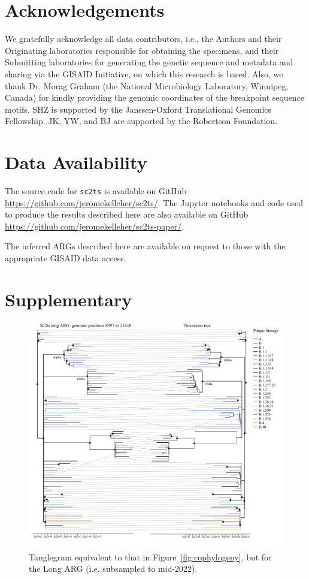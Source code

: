 \documentclass{article}
\begin{document}
\section{Acknowledgements}
We gratefully acknowledge all data contributors, i.e., the Authors and their
Originating laboratories responsible for obtaining the specimens, and their
Submitting laboratories for generating the genetic sequence and metadata and
sharing via the GISAID Initiative, on which this research is based. Also, we
thank Dr. Morag Graham (the National Microbiology Laboratory, Winnipeg, Canada)
for kindly providing the genomic coordinates of the breakpoint sequence motifs.
SHZ is supported by the Janssen-Oxford Translational Genomics Fellowship. JK,
YW, and BJ are supported by the Robertson Foundation.

\section{Data Availability}
The source code for \texttt{sc2ts} is
available on GitHub
\url{https://github.com/jeromekelleher/sc2ts/}.
The Jupyter notebooks and code used to produce the results described here are also
available on GitHub \url{https://github.com/jeromekelleher/sc2ts-paper/}.

The inferred ARGs described here are available on request to those with
the appropriate GISAID data access.




\renewcommand\thefigure{S\arabic{figure}}
\setcounter{figure}{0}
\renewcommand\thetable{S\arabic{table}}
\setcounter{table}{0}
\section*{Supplementary}
\begin{figure} \centering
\includegraphics[width=\textwidth]{figures/supp_cophylogeny_long.pdf}
\caption{\label{fig:cophylogeny_long}Tanglegram equivalent to that in Figure~\ref{fig:cophylogeny},
but for the Long ARG (i.e. subsampled to mid-2022).}
\end{figure}
\end{document}
